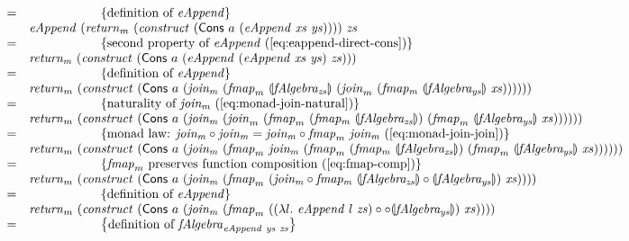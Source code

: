 \documentclass{jfp1}
\newcommand{\fold}[1]{\llparenthesis #1 \rrparenthesis}
\newcommand{\eqAnnotation}[1]{\hspace{2cm}\left\{\textrm{#1}\right\}}
\begin{document}
\begin{proof*}
\begin{displaymath}
\begin{array}{cl}
      =&\eqAnnotation{definition of $\mathit{eAppend}$} \\
      & \mathit{eAppend}~(\mathit{return}_m~(\mathit{construct}~(\mathsf{Cons}~a~(\mathit{eAppend}~\mathit{xs}~\mathit{ys}))))~\mathit{zs} \\
      =&\eqAnnotation{second property of $\mathit{eAppend}$ (\autoref{eq:eappend-direct-cons})} \\
      & \mathit{return_m}~(\mathit{construct}~(\mathsf{Cons}~a~(\mathit{eAppend}~(\mathit{eAppend}~\mathit{xs}~\mathit{ys})~\mathit{zs}))) \\
      =&\eqAnnotation{definition of $\mathit{eAppend}$} \\
      &\mathit{return}_m~(\mathit{construct}~(\mathsf{Cons}~a~(\mathit{join_m}~(\mathit{fmap}_m~\fold{\mathit{fAlgebra_{zs}}}~(\mathit{join}_m~(\mathit{fmap_m}~\fold{\mathit{fAlgebra_{ys}}}~\mathit{xs})))))) \\
      =&\eqAnnotation{naturality of $\mathit{join_m}$ (\autoref{eq:monad-join-natural})} \\
      &\mathit{return}_m~(\mathit{construct}~(\mathsf{Cons}~a~(\mathit{join_m}~(\mathit{join}_m~(\mathit{fmap}_m~(\mathit{fmap_m}~\fold{\mathit{fAlgebra_{zs}}})~(\mathit{fmap}_m~\fold{\mathit{fAlgebra_{ys}}}~\mathit{xs})))))) \\
      =&\eqAnnotation{monad law: $\mathit{join_m} \circ \mathit{join_m} = \mathit{join_m} \circ \mathit{fmap}_m~\mathit{join_m}$ (\autoref{eq:monad-join-join})} \\
      &\mathit{return}_m~(\mathit{construct}~(\mathsf{Cons}~a~(\mathit{join_m}~(\mathit{fmap}_m~\mathit{join_m}~(\mathit{fmap}_m~(\mathit{fmap_m}~\fold{\mathit{fAlgebra_{zs}}})~(\mathit{fmap}_m~\fold{\mathit{fAlgebra_{ys}}}~\mathit{xs})))))) \\
      =&\eqAnnotation{$\mathit{fmap}_m$ preserves function composition (\autoref{eq:fmap-comp})} \\
      & \mathit{return}_m~(\mathit{construct}~(\mathsf{Cons}~a~(\mathit{join_m}~(\mathit{fmap}_m~(\mathit{join_m} \circ \mathit{fmap_m}~\fold{\mathit{fAlgebra_{zs}}} \circ \fold{\mathit{fAlgebra_{ys}}})~\mathit{xs})))) \\
      =&\eqAnnotation{definition of $\mathit{eAppend}$} \\
      & \mathit{return}_m~(\mathit{construct}~(\mathsf{Cons}~a~(\mathit{join_m}~(\mathit{fmap}_m~((\lambda l.~\mathit{eAppend}~l~\mathit{zs}) \circ \circ \fold{\mathit{fAlgebra_{ys}}})~\mathit{xs})))) \\
      =&\eqAnnotation{definition of $\mathit{fAlgebra}_{\mathit{eAppend}~\mathit{ys}~\mathit{zs}}$} \\

\end{array}
\end{displaymath}
\end{proof*}
\end{document}

